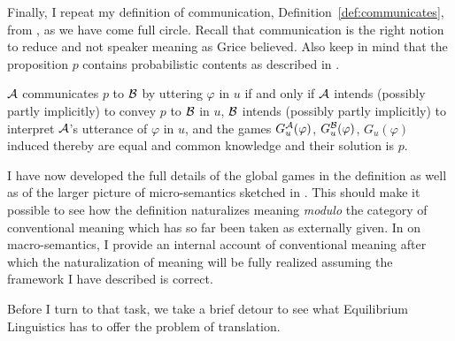 Finally, I repeat my definition of communication, Definition~\ref{def:communicates}, from , as we have come full circle. Recall that communication is the right notion to reduce and not speaker meaning as Grice believed. Also keep in mind that the proposition $p$ contains probabilistic contents as described in .

\begin{definition}

$\cal A$ communicates $p$ to $\cal B$ by uttering $\varphi$ in $u$ if and only if $\cal A$ intends (possibly partly implicitly) to convey $p$ to $\cal B$ in $u$, $\cal B$ intends (possibly partly implicitly) to interpret $\cal A$'s utterance of 
$\varphi$ in $u$, and the games $G^{\cal A}_u(\varphi)$, $G^{\cal B}_u(\varphi)$, $G_u(\varphi)$ induced thereby are equal and common knowledge and their solution is $p$.

\label{def:communicates 2}
\end{definition}

I have now developed the full details of the global games in the definition as well as of the larger picture of micro-semantics sketched in . This should make it possible to see how the definition naturalizes meaning \emph{modulo} the category of conventional meaning which has so far been taken as externally given. In  on macro-semantics, I provide an internal account of conventional meaning after which the naturalization of meaning will be fully realized assuming the framework I have described is correct.

Before I turn to that task, we take a brief detour to see what Equilibrium Linguistics has to offer the problem of translation.
